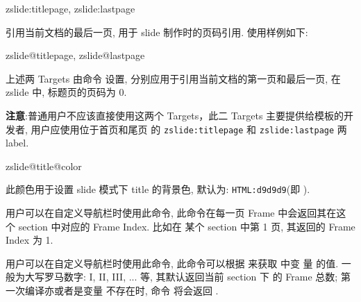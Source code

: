 \begin{function}[updated=2025-04-25]{zslide:titlepage, zslide:lastpage}
  \begin{syntax}
    \cmd{\pageref}
    \cmd{\pageref}
  \end{syntax}
  引用当前文档的最后一页, 用于 slide 制作时的页码引用. 使用样例如下:
\end{function}


\begin{function}[updated=2024-11-05]{zslide@titlepage, zslide@lastpage}
  \begin{syntax}
  \end{syntax}
  上述两 Targets 由命令  设置, 分别应用于引用当前文档的第一页和最后一页, 在 zslide 中, 标题页的页码为 0.\par
  \textbf{注意}:普通用户不应该直接使用这两个 Targets，此二 Targets 主要提供给模板的开发者, 用户应使用位于首页和尾页
  的 \texttt{zslide:titlepage} 和 \texttt{zslide:lastpage} 两 label.
\end{function}


\begin{function}[updated=2025-04-25]{zslide@title@color}
  \begin{syntax}
  \end{syntax}
  此颜色用于设置 slide 模式下 title 的背景色, 默认为: \texttt{HTML:d9d9d9}(即 ).
\end{function}


\begin{function}[updated=2025-04-25]{\zslideframeind}
  \begin{syntax}
  \end{syntax}
  用户可以在自定义导航栏时使用此命令, 此命令在每一页 Frame 中会返回其在这个 section 中对应的 Frame Index. 比如在
  某个 section 中第 1 页, 其返回的 Frame Index 为 1.
\end{function}


\begin{function}[updated=2025-04-25]{\zslideframeall}
  \begin{syntax}
  \end{syntax}
  用户可以在自定义导航栏时使用此命令, 此命令可以根据  来获取  中变
  量  的值.  一般为大写罗马数字: I, II, III, ... 等, 其默认返回当前 section 下
  的 Frame 总数; 第一次编译亦或者是变量  不存在时, 命令  将会返回 .
\end{function}


